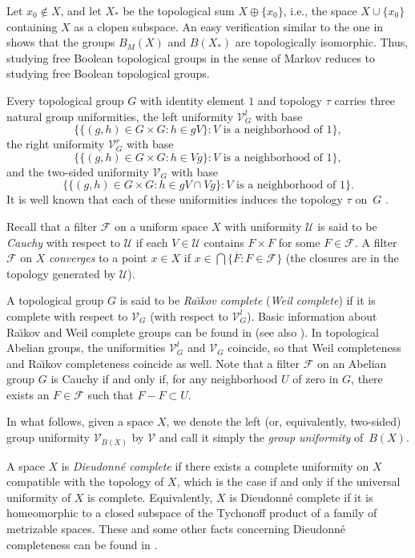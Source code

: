\documentclass[a4paper,12pt]{amsart}
\theoremstyle{definition}
\begin{document}
Let $x_0\notin X$, and let $X_\ast$ be the topological sum $X\oplus\{x_0\}$, 
i.e., the space $X\cup \{x_0\}$ containing  $X$ as a clopen subspace. 
An easy verification similar to the one in \cite[Section~2]{Gra} shows that the 
groups $B_M(X)$ and $B(X_\ast)$ are topologically isomorphic. Thus, studying 
free Boolean topological groups in the sense of Markov reduces to studying free 
Boolean topological groups.

Every topological group $G$ with identity element $1$ and topology $\tau$ 
carries three natural group uniformities, the left uniformity $\mathscr V^l_G$ 
with base 
$$
\{\{(g,h)\in G\times G: h\in gV\}: \text{$V$ is a neighborhood of $1$}\}, 
$$
the right uniformity $\mathscr V^r_G$ with base 
$$
\{\{(g,h)\in G\times G: h\in Vg\}: \text{$V$ is a neighborhood of $1$}\}, 
$$ 
and the two-sided uniformity $\mathscr V_G$ with base 
$$ 
\{\{(g,h)\in G\times G: h\in gV\cap Vg\}: \text{$V$ is a neighborhood of 
$1$}\}. 
$$
It is well known that each of these uniformities induces the topology $\tau$ 
on~$G$ \cite[Example~8.1.17]{Eng}.

Recall that a filter $\mathscr F$ on a uniform space $X$ with uniformity 
$\mathscr U$ is said to be \emph{Cauchy} with respect to $\mathscr U$ if each 
$V\in \mathscr U$ contains $F\times F$ for some $F\in \mathscr F$. A filter 
$\mathscr F$ on $X$ \emph{converges} to a point $x\in X$ if $x\in \bigcap 
\{\overline F: F\in \mathscr F\}$ (the closures are in the topology generated 
by $\mathscr U$). 

A topological group $G$ is said to be  \emph{Ra\u{\i}kov 
complete} (\emph{Weil complete}) if it is complete with respect to $\mathscr 
V_G$ (with respect to $\mathscr V^l_G$). Basic information about Ra\u{\i}kov 
and Weil complete groups can be found in \cite[Section~3.6]{AT} (see also 
\cite{Raikov}). In topological Abelian groups, the uniformities $\mathscr 
V^l_G$ and $\mathscr V_G$ coincide, so that  Weil completeness and Ra\u{\i}kov 
completeness coincide as well. Note that a filter $\mathscr F$ on an Abelian 
group $G$ is Cauchy if and only if, for any neighborhood $U$ of zero in $G$, 
there exists an $F\in \mathscr F$ such that $F-F\subset U$. 

In what follows, given a space $X$, we denote the left (or, equivalently, 
two-sided) group uniformity $\mathscr V_{B(X)}$ by $\mathscr V$ and call it 
simply the \emph{group uniformity} of~$B(X)$. 

A space $X$ is \emph{Dieudonn\'e complete} if there exists a complete 
uniformity on $X$ compatible with the topology of $X$, which is the case if 
and only if the universal uniformity of $X$ is complete. Equivalently, $X$ is 
Dieudonn\'e complete if it is homeomorphic to a closed subspace of the 
Tychonoff product of a family of metrizable spaces. These and some other facts 
concerning Dieudonn\'e completeness can be found in \cite[Section~8.5.13]{Eng}.
\end{document}
